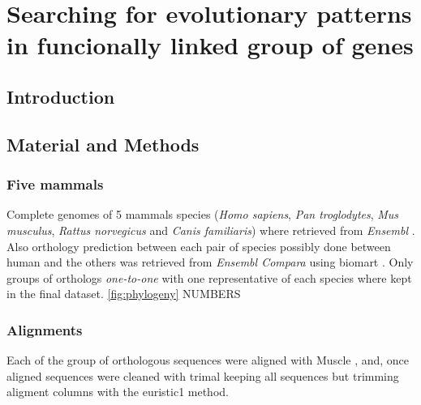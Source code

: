 

\chapter{Searching for evolutionary patterns in funcionally
  linked group of genes}

\section{Introduction}

\section{Material and Methods}

\subsection{Five mammals}

Complete genomes of 5 mammals species (\textit{Homo sapiens},
\textit{Pan troglodytes}, \textit{Mus musculus}, \textit{Rattus norvegicus} and
\textit{Canis familiaris}) where retrieved from \textit{Ensembl}
\cite{Flicek2011}. Also orthology prediction between each pair of species
possibly done between human and the others was retrieved from
\textit{Ensembl Compara} \cite{Vilella2009} using biomart \cite{Kinsella2011}.
Only groups of orthologs \textit{one-to-one} with one representative of each
species where kept in the final dataset.
\ref{fig:phylogeny}
NUMBERS

\subsection{Alignments}
Each of the group of orthologous sequences were aligned with Muscle
\cite{Edgar2004}, and, once aligned sequences were cleaned with trimal
\cite{Capella-Gutierrez2009} keeping all sequences but trimming aligment columns
with the euristic1 method.


